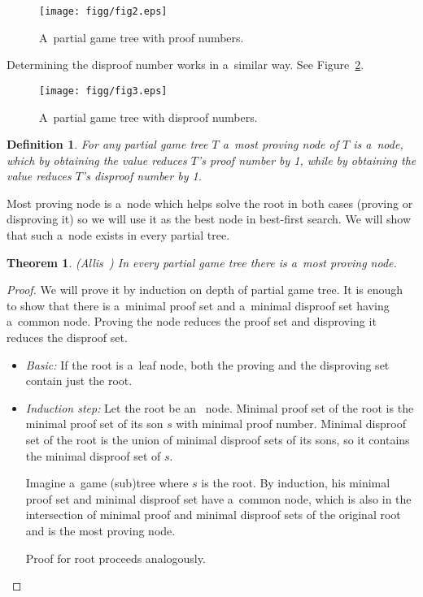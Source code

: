 \begin{figure}
	\centerline{\mbox{\texttt{[image: figg/fig2.eps]}}}
	\caption{A~partial game tree with proof numbers.}
	\label{tri}
\end{figure}

Determining the disproof number works in a~similar way. See
Figure~\ref{ctyri}. 

\begin{figure}
	\centerline{\mbox{\texttt{[image: figg/fig3.eps]}}}
	\caption{A~partial game tree with disproof numbers.}
	\label{ctyri}
\end{figure}

\newtheorem*{mostProvingNode}{Definition}	
\begin{mostProvingNode}
	For any partial game tree $T$ a~{\sl most proving node} of $T$ is a~node, which by 
	obtaining the value  reduces $T$'s proof number by 1, while by obtaining the
	value  reduces $T$'s disproof number by 1.
\end{mostProvingNode}

Most proving node is a~node which helps solve the root in both cases (proving
or disproving it) so we will use it as the best node in best-first search. We
will show that such a~node exists in every partial tree.

\newtheorem{mpnExist}{Theorem}
\begin{mpnExist}
	(Allis~\cite{allis}) In every partial game tree there is a~most proving node.
\end{mpnExist}

\begin{proof}

	We will prove it by induction on depth of partial game tree.
	It is enough to show that there is a~minimal proof set and a~minimal disproof set having 
	a~common node. Proving the node reduces the proof set and disproving it reduces the
	disproof set.

	\begin{itemize} 
		\item \textit{Basic:} 
			If the root is a~leaf node, both the proving and the disproving set 
			contain just the root.
		\item \textit{Induction step:}
			Let the root be an~ node. Minimal proof set of the root is the minimal proof set
			of its son $s$ with minimal proof number. Minimal disproof set of the root
			is the union of minimal disproof sets of its sons, so it contains
			the minimal disproof set of $s$.

			Imagine a~game (sub)tree where $s$ is the root. By induction, his
			minimal proof set and minimal disproof set have a~common node, which is also 
			in the intersection of minimal proof and minimal disproof sets of the original root and
			is the most proving node.

			Proof for  root proceeds analogously.
	\end{itemize}
\end{proof}


